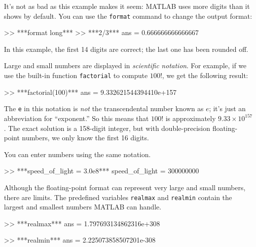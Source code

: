  

It's not as bad as this example makes it seem: MATLAB uses more digits than it shows by default.
You can use the \lstinline{format} command to change the output format:


\begin{code}
>> ***format long***
>> ***2/3***
ans = 0.666666666666667
\end{code}

In this example, the first 14 digits are correct; the last one has been rounded off.


Large and small numbers are displayed in {\em scientific notation}. 
For example, if we use the built-in function \lstinline{factorial} to compute $100!$, we get the following result:

\begin{code}
>> ***factorial(100)***
ans = 9.332621544394410e+157
\end{code}

The \lstinline{e} in this notation is {\em not} the transcendental number
known as $e$; it's just an abbreviation for ``exponent.''  So
this means that $100!$ is approximately $9.33 \times 10^{157}$.  The
exact solution is a 158-digit integer, but with double-precision floating-point numbers, we only know the first 16 digits.


You can enter numbers using the same notation.

\begin{code}
>> ***speed_of_light = 3.0e8***
speed_of_light = 300000000
\end{code}

Although the floating-point format can represent very large and small numbers, 
there are limits.  
The predefined variables \lstinline{realmax} and \lstinline{realmin}
contain the largest and smallest numbers MATLAB 
can handle.


\begin{code}
>> ***realmax***
ans = 1.797693134862316e+308

>> ***realmin***
ans = 2.225073858507201e-308
\end{code}


